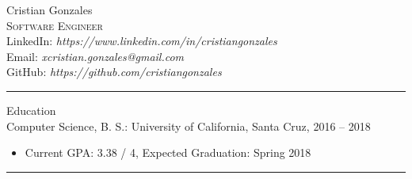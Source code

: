 \documentclass{res}
\begin{document}
\begin{resume}

{\Huge Cristian Gonzales}\\
\vspace{2mm}
\textsc{\large Software Engineer}\\
LinkedIn: \textit{https://www.linkedin.com/in/cristiangonzales}\\
Email: \textit{xcristian.gonzales@gmail.com}\\
GitHub: \textit{https://github.com/cristiangonzales}\\

\hrule width18.5cm

{\huge Education}\\[2mm]
{\Large Computer Science, B. S.: University of California, Santa Cruz, 2016 -- 2018}\\
	\begin{itemize}
		\vspace{-3mm}
		\item Current GPA: 3.38 / 4, Expected Graduation: Spring 2018
	\end{itemize}
\vspace{-1mm}
\leavevmode

\hrule width18.5cm


\end{resume}
\end{document}
